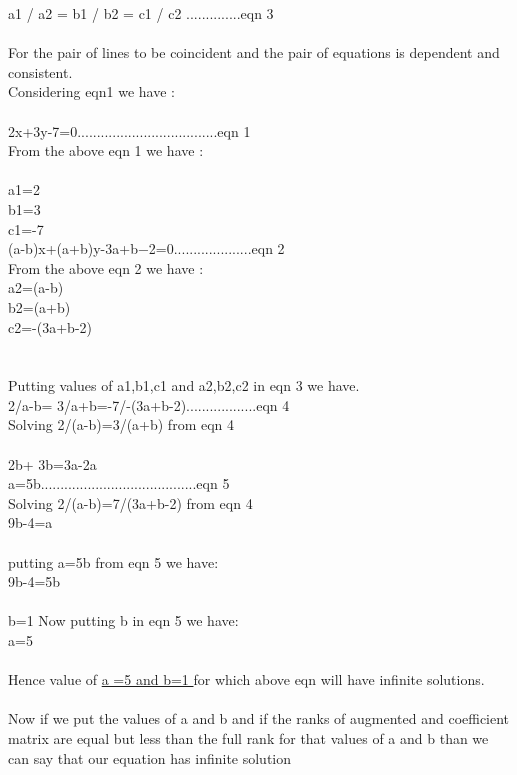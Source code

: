\documentclass[12pt]{article}%
\begin{document}
a1 / a2 = b1 / b2 = c1 / c2 ..............eqn 3\\
\\
For  the pair of lines to be  coincident and the pair of equations is dependent and consistent.\\
Considering eqn1 we have :\\
\\
2x+3y-7=0....................................eqn 1
\\
From the above eqn 1 we have :\\
\\
 a1=2 \\
 b1=3\\
 c1=-7\\
(a-b)x+(a+b)y-3a+b−2=0....................eqn 2\\
From the above eqn 2 we have :
\\
a2=(a-b)\\
b2=(a+b)\\
c2=-(3a+b-2)\\
\\
\\
Putting values of a1,b1,c1 and a2,b2,c2 in eqn 3 we have.
\\
2/a-b= 3/a+b=-7/-(3a+b-2)..................eqn 4
\\
Solving 2/(a-b)=3/(a+b) from eqn 4\\
\\
2b+ 3b=3a-2a
\\
a=5b........................................eqn 5
\\
Solving 2/(a-b)=7/(3a+b-2) from eqn 4
\\
9b-4=a\\
\\
putting a=5b from eqn 5 we have:\\
9b-4=5b
\\
\\
b=1
Now putting b in eqn 5 we have:\\
a=5
\\
\\
Hence value of \underline{a =5 and b=1 }for which above eqn will have infinite solutions.
\\
\\
Now if we put the values of a and b and if the ranks of augmented and coefficient matrix are equal but less than the full rank for that values of a and b than we can say that our equation has infinite solution
\end{document}
